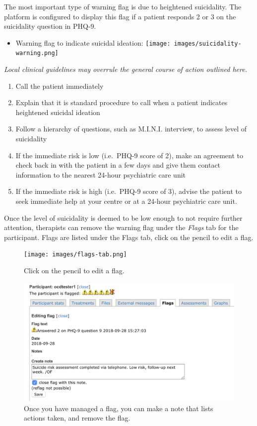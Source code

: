 \documentclass[]{book}
\providecommand{\tightlist}{%
  \setlength{\itemsep}{0pt}\setlength{\parskip}{0pt}}
\theoremstyle{definition}
\theoremstyle{definition}
\theoremstyle{definition}
\theoremstyle{remark}
\begin{document}
The most important type of warning flag is due to heightened
suicidality. The platform is configured to display this flag if a
patient responds 2 or 3 on the suicidality question in PHQ-9.

\begin{itemize}
\tightlist
\item
  Warning flag to indicate suicidal ideation:
  \texttt{[image: images/suicidality-warning.png]}
\end{itemize}

\emph{Local clinical guidelines may overrule the general course of
action outlined here.}

\begin{enumerate}
\def\labelenumi{\arabic{enumi}.}
\tightlist
\item
  Call the patient immediately
\item
  Explain that it is standard procedure to call when a patient indicates
  heightened suicidal ideation
\item
  Follow a hierarchy of questions, such as M.I.N.I. interview, to assess
  level of suicidality
\item
  If the immediate risk is low (i.e.~PHQ-9 score of 2), make an
  agreement to check back in with the patient in a few days and give
  them contact information to the nearest 24-hour psychiatric care unit
\item
  If the immediate risk is high (i.e.~PHQ-9 score of 3), advise the
  patient to seek immediate help at your centre or at a 24-hour
  psychiatric care unit.
\end{enumerate}

Once the level of suicidality is deemed to be low enough to not require
further attention, therapists can remove the warning flag under the
\emph{Flags} tab for the participant. Flags are listed under the Flags
tab, click on the pencil to edit a flag.

\begin{figure}
\centering
\texttt{[image: images/flags-tab.png]}
\caption{Click on the pencil to edit a flag.}
\end{figure}

\begin{figure}
\centering
\includegraphics{images/remove-flag.png}
\caption{Once you have managed a flag, you can make a note that lists
actions taken, and remove the flag.}
\end{figure}
\end{document}
